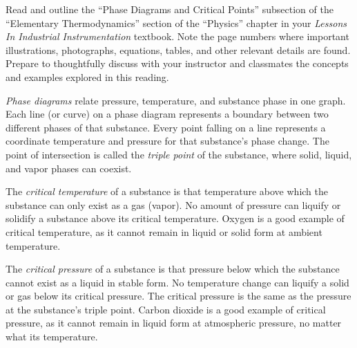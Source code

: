 

Read and outline the ``Phase Diagrams and Critical Points'' subsection of the ``Elementary Thermodynamics'' section of the ``Physics'' chapter in your {\it Lessons In Industrial Instrumentation} textbook.  Note the page numbers where important illustrations, photographs, equations, tables, and other relevant details are found.  Prepare to thoughtfully discuss with your instructor and classmates the concepts and examples explored in this reading.














{\it Phase diagrams} relate pressure, temperature, and substance phase in one graph.  Each line (or curve) on a phase diagram represents a boundary between two different phases of that substance.  Every point falling on a line represents a coordinate temperature and pressure for that substance's phase change.  The point of intersection is called the {\it triple point} of the substance, where solid, liquid, and vapor phases can coexist.

\vskip 10pt

The {\it critical temperature} of a substance is that temperature above which the substance can only exist as a gas (vapor).  No amount of pressure can liquify or solidify a substance above its critical temperature.  Oxygen is a good example of critical temperature, as it cannot remain in liquid or solid form at ambient temperature.

\vskip 10pt

The {\it critical pressure} of a substance is that pressure below which the substance cannot exist as a liquid in stable form.  No temperature change can liquify a solid or gas below its critical pressure.  The critical pressure is the same as the pressure at the substance's triple point.  Carbon dioxide is a good example of critical pressure, as it cannot remain in liquid form at atmospheric pressure, no matter what its temperature.

